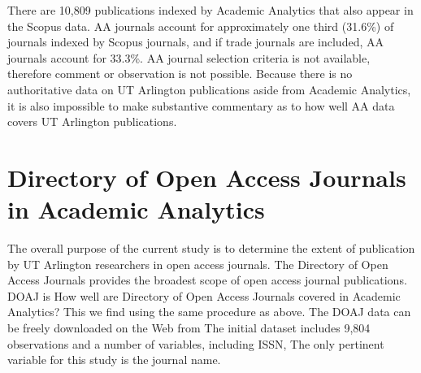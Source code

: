 \documentclass{article}
\begin{document}
There are 10,809 publications indexed by Academic Analytics that also appear in the Scopus data. 
AA journals account for approximately one third (31.6\%) of journals indexed by Scopus journals, and if trade journals are included, AA journals account for 33.3\%.
AA journal selection criteria is not available, therefore comment or observation is not possible.
Because there is no authoritative data on UT Arlington publications aside from Academic Analytics, it is also impossible to make substantive commentary as to how well AA data covers UT Arlington publications.

\section{Directory of Open Access Journals in Academic Analytics}
The overall purpose of the current study is to determine the extent of publication by UT Arlington researchers in open access journals.
The Directory of Open Access Journals provides the broadest scope of open access journal publications.
DOAJ is %
How well are Directory of Open Access Journals covered in Academic Analytics?
This we find using the same procedure as above.
The DOAJ data can be freely downloaded on the Web from %
The initial dataset includes 9,804 observations and a number of variables, including ISSN, %
The only pertinent variable for this study is the journal name.
\end{document}
